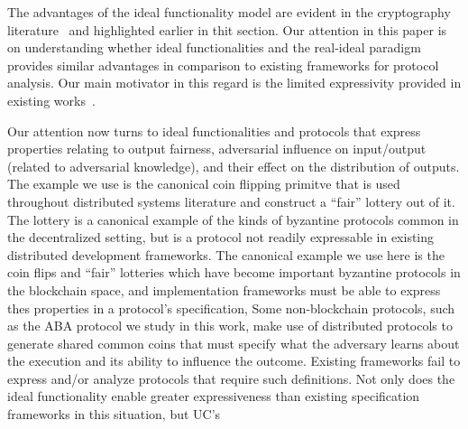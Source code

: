 

The advantages of the ideal functionality model are evident in the cryptography literature~\cite{people, praising, it} and highlighted earlier in thit section.
Our attention in this paper is on understanding whether ideal functionalities and the real-ideal paradigm provides similar advantages in comparison to existing frameworks for protocol analysis.
Our main motivator in this regard is the limited expressivity provided in existing works~\cite{tholoniat, and, all, the, others}.



Our attention now turns to ideal functionalities and protocols that express
properties relating to output fairness, adversarial influence on input/output
(related to adversarial knowledge), and their effect on the distribution of
outputs.  The example we use is the canonical coin flipping primitve that is
used throughout distributed systems literature and construct a ``fair'' lottery
out of it.  The lottery is a canonical example of the kinds of byzantine
protocols common in the decentralized setting, but is a protocol not readily
expressable in existing distributed development frameworks.  The
canonical example we use here is the coin flips and ``fair'' lotteries which
have become important byzantine protocols in the blockchain space, and
implementation frameworks must be able to express thes properties in a
protocol's specification, Some non-blockchain protocols, such as the ABA
protocol we study in this work, make use of distributed protocols to generate
shared common coins that must specify what the adversary learns about the
execution and its ability to influence the outcome.  Existing frameworks fail
to express and/or analyze protocols that require such definitions.  Not only
does the ideal functionality enable greater expressiveness than existing
specification frameworks in this situation, but UC's 


